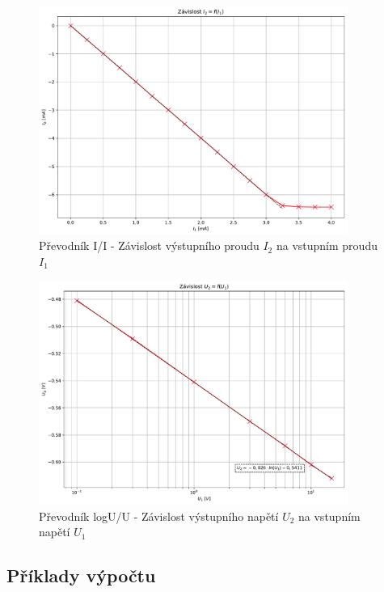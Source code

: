 \documentclass[a4paper, czech]{article}
\begin{document}
\begin{figure}[H]
    \centering
    \includegraphics[width=0.9\textwidth]{grafy/graf_prevodnik_II.pdf}
    \caption{Převodník I/I - Závislost výstupního proudu $I_2$ na vstupním proudu $I_1$}
\end{figure}

\begin{figure}[H]
    \centering
    \includegraphics[width=0.9\textwidth]{grafy/graf_prevodnik_logUU.pdf}
    \caption{Převodník logU/U - Závislost výstupního napětí $U_2$ na vstupním napětí $U_1$}
\end{figure}

\subsection{Příklady výpočtu}
\end{document}
